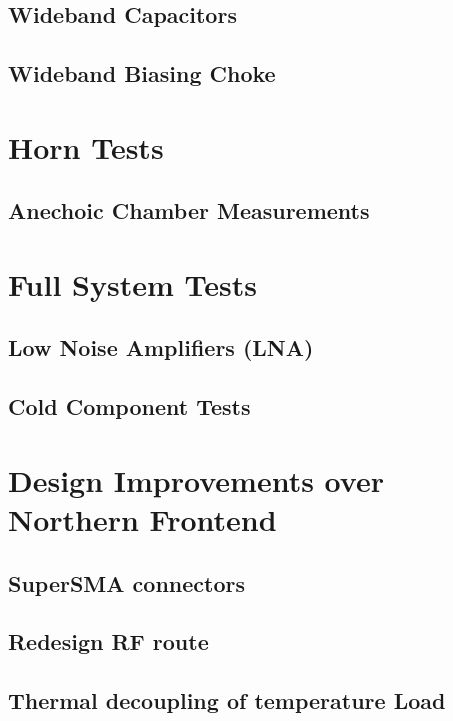 \subsection{Wideband Capacitors}

\subsection{Wideband Biasing Choke}

\section{Horn Tests}
  \subsection{Anechoic Chamber Measurements}


\section{Full System Tests}
  \subsection{Low Noise Amplifiers (LNA)}

\subsection{Cold Component Tests} 

\section{Design Improvements over Northern Frontend}

  \subsection{SuperSMA connectors}

  \subsection{Redesign RF route}

  \subsection{Thermal decoupling of temperature Load}


  


